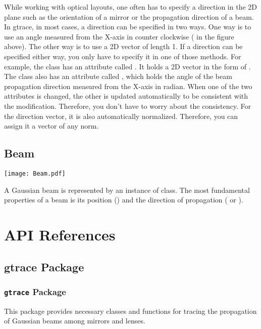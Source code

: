 \documentclass[letterpaper,10pt,english]{sphinxmanual}
\begin{document}
While working with optical layouts, one often has to specify a direction in the 2D plane such as the orientation of a mirror or the propagation direction of a beam. In gtrace, in most cases, a direction can be specified in two ways. One way is to use an angle measured from the X-axis in counter clockwise ( in the figure above). The other way is to use a 2D vector of length 1. If a direction can be specified either way, you only have to specify it in one of those methods. For example, the {\hyperref[api/gtrace:gtrace.beam.GaussianBeam]{}} class has an attribute called . It holds a 2D vector in the form of . The {\hyperref[api/gtrace:gtrace.beam.GaussianBeam]{}} class also has an attribute called , which holds the angle of the beam propagation direction measured from the X-axis in radian.  When one of the two attributes is changed, the other is updated automatically to be consistent with the modification. Therefore, you don't have to worry about the consistency. For the direction vector, it is also automatically normalized. Therefore, you can assign it a vector of any norm.


\section{Beam}
\label{basic_concepts:beam}
\texttt{[image: Beam.pdf]}

A Gaussian beam is represented by an instance of {\hyperref[api/gtrace:gtrace.beam.GaussianBeam]{}} class. The most fundamental properties of a beam is its position () and the direction of propagation ( or ).


\chapter{API References}
\label{api/modules:api-references}\label{api/modules::doc}

\section{gtrace Package}
\label{api/gtrace:gtrace-package}\label{api/gtrace::doc}

\subsection{\texttt{gtrace} Package}
\label{api/gtrace:id1}\label{api/gtrace:module-gtrace.__init__}
This package provides necessary classes and functions for tracing the propagation
of Gaussian beams among mirrors and lenses.
\end{document}
